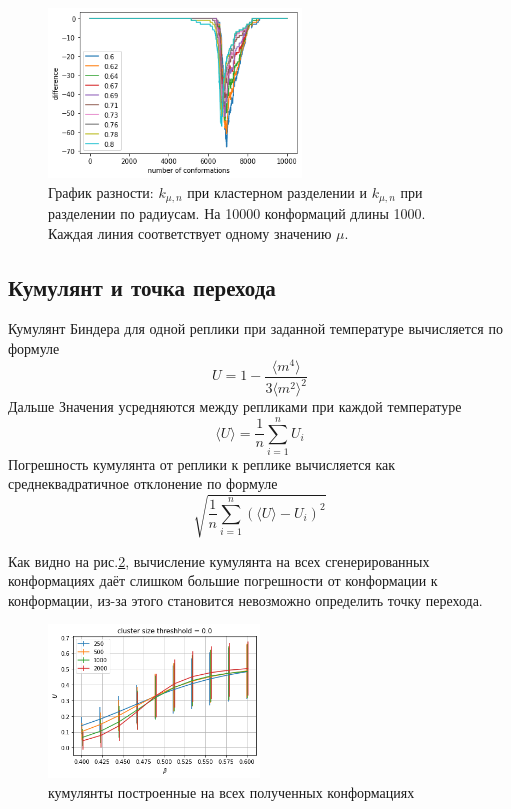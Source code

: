 \begin{figure}[H]
	\centering
	\includegraphics[width=0.6\textwidth]{../images/radius_and_cluster_comparising_L1000.png}
	\caption{График разности: $k_{\mu, n}$ при кластерном разделении и $k_{\mu, n}$ при разделении по радиусам. На 10000 конформаций длины 1000. Каждая линия соответствует одному значению $\mu$.}
	\label{fig:kmun_dif}
\end{figure}



\subsection{Кумулянт и точка перехода}

Кумулянт Биндера для одной реплики при заданной температуре вычисляется по формуле 
\[
U = 1 - \frac{\langle m^4\rangle}{3\langle m^2\rangle ^2}
\]
Дальше Значения усредняются между репликами при каждой температуре 
\[
\langle U\rangle = \frac{1}{n}\sum_{i=1}^{n}U_i
\]
Погрешность кумулянта от реплики к реплике вычисляется как среднеквадратичное отклонение по формуле 
\[
\sqrt{\frac{1}{n}\sum_{i=1}^{n}(\langle U\rangle - U_i)^2}
\]

Как видно на рис.\ref{fig:cumulant_raw}, вычисление кумулянта на всех сгенерированных конформациях даёт слишком большие погрешности от конформации к конформации, из-за этого становится невозможно определить точку перехода.

\begin{figure}[ht]
	\centering
	\includegraphics[width=0.5\textwidth]{../images/Cumulant_raw_beta0.4_0.6.png}
	\caption{кумулянты построенные на всех полученных конформациях}
	\label{fig:cumulant_raw}
\end{figure}

